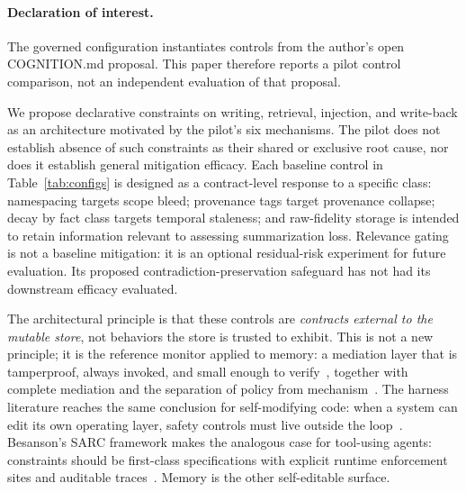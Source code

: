 \documentclass[11pt]{article}
\begin{document}
\paragraph{Declaration of interest.} The governed configuration instantiates
controls from the author's open COGNITION.md proposal. This paper therefore
reports a pilot control comparison, not an independent evaluation of
that proposal.

We propose declarative constraints on writing, retrieval, injection, and
write-back as an architecture motivated by the pilot's six mechanisms. The
pilot does not establish absence of such constraints as their shared or
exclusive root cause, nor does it establish general mitigation efficacy.
Each baseline control in Table~\ref{tab:configs} is designed as a
contract-level response to a specific class: namespacing targets scope bleed;
provenance tags target provenance collapse; decay by fact class targets
temporal staleness; and raw-fidelity storage is intended to retain information
relevant to assessing summarization loss. Relevance gating is not a baseline mitigation: it is an
optional residual-risk experiment for future evaluation. Its proposed
contradiction-preservation safeguard has not had its downstream efficacy
evaluated.

The architectural principle is that these controls are \emph{contracts
external to the mutable store}, not behaviors the store is trusted to
exhibit. This is not a new principle; it is the reference monitor applied
to memory: a mediation layer that is tamperproof, always invoked, and
small enough to verify~\cite{anderson1972}, together with complete
mediation and the separation of policy from
mechanism~\cite{saltzer1975protection}. The harness literature reaches
the same conclusion for self-modifying code: when a system can edit its
own operating layer, safety controls must live outside the
loop~\cite{weng2026harness}. Besanson's SARC framework makes the analogous
case for tool-using agents: constraints should be first-class specifications
with explicit runtime enforcement sites and auditable traces~\cite{besanson2026sarc}.
Memory is the other self-editable surface.
\end{document}
